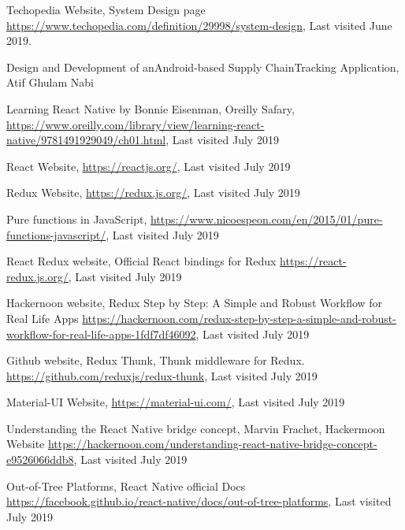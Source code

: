 \begin{thebibliography}{99}

Techopedia Website, System Design page
\url{https://www.techopedia.com/definition/29998/system-design}, Last visited June 2019.

Design and Development of anAndroid-based Supply ChainTracking Application, Atif Ghulam Nabi

Learning React Native by Bonnie Eisenman, Oreilly Safary, 
\url{https://www.oreilly.com/library/view/learning-react-native/9781491929049/ch01.html}, Last visited July 2019

React Website, 
\url{https://reactjs.org/}, Last visited July 2019

Redux Website, 
\url{https://redux.js.org/}, Last visited July 2019

Pure functions in JavaScript, 
\url{https://www.nicoespeon.com/en/2015/01/pure-functions-javascript/}, Last visited July 2019

React Redux website, Official React bindings for Redux 
\url{https://react-redux.js.org/}, Last visited July 2019

Hackernoon website, Redux Step by Step: A Simple and Robust Workflow for Real Life Apps 
\url{https://hackernoon.com/redux-step-by-step-a-simple-and-robust-workflow-for-real-life-apps-1fdf7df46092}, Last visited July 2019

Github website, Redux Thunk, Thunk middleware for Redux.
\url{https://github.com/reduxjs/redux-thunk}, Last visited July 2019

Material-UI Website, 
\url{https://material-ui.com/}, Last visited July 2019

Understanding the React Native bridge concept, Marvin Frachet, Hackermoon Website
\url{https://hackernoon.com/understanding-react-native-bridge-concept-e9526066ddb8}, Last visited July 2019

Out-of-Tree Platforms, React Native official Docs
\url{https://facebook.github.io/react-native/docs/out-of-tree-platforms}, Last visited July 2019

\end{thebibliography}

